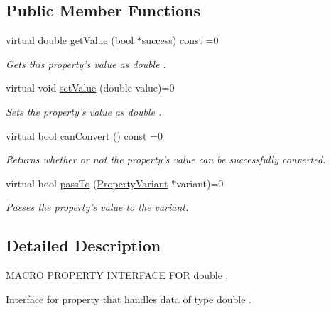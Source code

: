 \subsection*{Public Member Functions}
\begin{DoxyCompactItemize}
\item 
virtual double \hyperlink{class_i_double_property_af9143d685793a22249eb50b2515260ac}{get\-Value} (bool $\ast$success) const =0
\begin{DoxyCompactList}\small\item\em Gets this property's value as double . \end{DoxyCompactList}\item 
virtual void \hyperlink{class_i_double_property_a900dcb23ea5981475417e3cdfee001e3}{set\-Value} (double value)=0
\begin{DoxyCompactList}\small\item\em Sets the property's value as double . \end{DoxyCompactList}\item 
virtual bool \hyperlink{class_i_double_property_afe5368913e955ec08c2797521d43d24a}{can\-Convert} () const =0
\begin{DoxyCompactList}\small\item\em Returns whether or not the property's value can be successfully converted. \end{DoxyCompactList}\item 
virtual bool \hyperlink{class_i_double_property_a84794c76ff8b48f676d9ca3fef8c22c5}{pass\-To} (\hyperlink{class_property_variant}{Property\-Variant} $\ast$variant)=0
\begin{DoxyCompactList}\small\item\em Passes the property's value to the variant. \end{DoxyCompactList}\end{DoxyCompactItemize}


\subsection{Detailed Description}
M\-A\-C\-R\-O P\-R\-O\-P\-E\-R\-T\-Y I\-N\-T\-E\-R\-F\-A\-C\-E F\-O\-R double . 

Interface for property that handles data of type double . 

